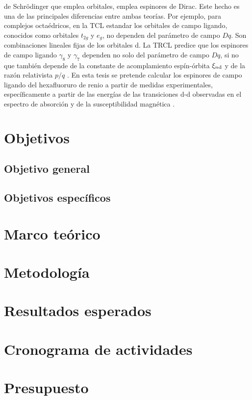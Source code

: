 \documentclass[12pt,a4paper]{article}
\begin{document}
de Schr\"odinger que emplea orbitales, emplea espinores de Dirac.
Este hecho es una de las principales diferencias entre ambas teor\'ias. Por ejemplo, para complejos octa\'edricos, en la TCL estandar
los orbitales de campo ligando, conocidos como orbitales $t_{2g}$ y $e_g$, no dependen del par\'ametro de campo $Dq$. Son combinaciones
lineales fijas de los orbitales d. La TRCL predice que los espinores de campo ligando $\gamma_8$ y $\gamma_7$ dependen no solo del
par\'ametro de campo $Dq$, si no que tambi\'en depende de la constante de acomplamiento esp\'in-\'orbita $\xi_{n{\rm d}}$ y de la
raz\'on relativista $p/q$ \cite{jperez2024a}.
En esta tesis se pretende calcular los espinores de campo ligando del hexafluoruro de renio a partir de medidas experimentales,
espec\'ificamente a partir de las energ\'ias de las transiciones d-d observadas en el espectro de absorci\'on \cite{Rotger1999}
y de la susceptibilidad magn\'etica \cite{Selig1962}.

\section{Objetivos}

\subsection{Objetivo general}

\subsection{Objetivos espec\'ificos}

\section{Marco te\'orico}

\section{Metodolog\'ia}

\section{Resultados esperados}

\section{Cronograma de actividades}

\section{Presupuesto}

\newpage


\end{document}

